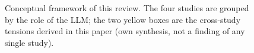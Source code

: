 \begin{figure}[t]
\caption{Conceptual framework of this review. The four studies are grouped by the role of the LLM; the two yellow boxes are the cross-study tensions derived in this paper (own synthesis, not a finding of any single study).}
\label{fig:framework}
\end{figure}
